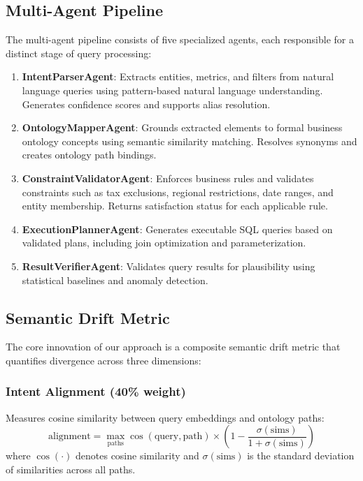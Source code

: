\documentclass[conference]{IEEEtran}
\begin{document}
\subsection{Multi-Agent Pipeline}

The multi-agent pipeline consists of five specialized agents, each responsible for a distinct stage of query processing:

\begin{enumerate}
\item \textbf{IntentParserAgent}: Extracts entities, metrics, and filters from natural language queries using pattern-based natural language understanding. Generates confidence scores and supports alias resolution.

\item \textbf{OntologyMapperAgent}: Grounds extracted elements to formal business ontology concepts using semantic similarity matching. Resolves synonyms and creates ontology path bindings.

\item \textbf{ConstraintValidatorAgent}: Enforces business rules and validates constraints such as tax exclusions, regional restrictions, date ranges, and entity membership. Returns satisfaction status for each applicable rule.

\item \textbf{ExecutionPlannerAgent}: Generates executable SQL queries based on validated plans, including join optimization and parameterization.

\item \textbf{ResultVerifierAgent}: Validates query results for plausibility using statistical baselines and anomaly detection.
\end{enumerate}

\subsection{Semantic Drift Metric}

The core innovation of our approach is a composite semantic drift metric that quantifies divergence across three dimensions:

\subsubsection{Intent Alignment (40\% weight)}
Measures cosine similarity between query embeddings and ontology paths:
\[
\text{alignment} = \max_{\text{paths}} \cos(\text{query}, \text{path}) \times \left(1 - \frac{\sigma(\text{sims})}{1 + \sigma(\text{sims})}\right)
\]
where $\cos(\cdot)$ denotes cosine similarity and $\sigma(\text{sims})$ is the standard deviation of similarities across all paths.
\end{document}
